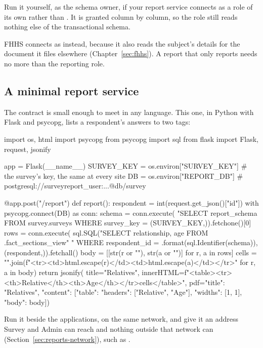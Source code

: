 \documentclass[11pt, a4paper]{article}
\begin{document}
Run it yourself, as the schema owner, if your report service connects as a role of its own
rather than . It is granted column by column, so the role still reads
nothing else of the transactional schema.

FHHS connects as  instead, because it also reads the subject's details for the
document it files elsewhere (Chapter~\ref{sec:fhhs}). A report that only reports needs no more
than the reporting role.

\subsection{A minimal report service}

The contract is small enough to meet in any language. This one, in Python with Flask and
psycopg, lists a respondent's answers to two tags:

\begin{elicitcmd}[fontsize = \footnotesize]
import os, html
import psycopg
from psycopg import sql
from flask import Flask, request, jsonify

app = Flask(__name__)
SURVEY_KEY = os.environ["SURVEY_KEY"]  # the survey's key, the same at every site
DB = os.environ["REPORT_DB"]  # postgresql://surveyreport_user:...@db/survey

@app.post("/report")
def report():
    respondent = int(request.get_json()["id"])
    with psycopg.connect(DB) as conn:
        schema = conn.execute(
            "SELECT report_schema FROM survey.surveys WHERE survey_key = %
            (SURVEY_KEY,)).fetchone()[0]
        rows = conn.execute(
            sql.SQL("SELECT relationship, age FROM {}.fact_sections_view"
                    " WHERE respondent_id = %
               .format(sql.Identifier(schema)), (respondent,)).fetchall()
    body = [[str(r or ""), str(a or "")] for r, a in rows]
    cells = "".join(f"<tr><td>{html.escape(r)}</td><td>{html.escape(a)}</td></tr>"
                    for r, a in body)
    return jsonify(
        title="Relatives",
        innerHTML=f"<table><tr><th>Relative</th><th>Age</th></tr>{cells}</table>",
        pdf={"title": "Relatives",
             "content": [{"table": {"headers": ["Relative", "Age"],
                                    "widths": [1, 1], "body": body}}]})
\end{elicitcmd}

Run it beside the applications, on the same network, and give it an address Survey and Admin
can reach and nothing outside that network can (Section~\ref{sec:reports-network}), such as
.
\end{document}
